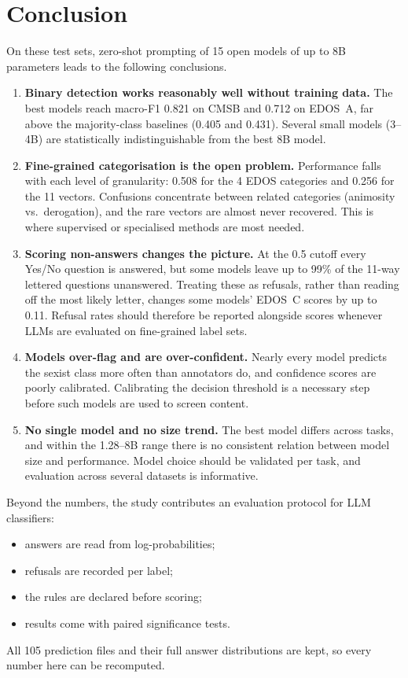 \documentclass[11pt]{article}
\begin{document}
\section{Conclusion}\label{sec:conclusion}
On these test sets, zero-shot prompting of 15 open models of up to 8B parameters leads to the following conclusions.
\begin{enumerate}
  \item \textbf{Binary detection works reasonably well without training data.} The best models reach macro-F1 0.821 on CMSB and 0.712 on EDOS~A, far above the majority-class baselines (0.405 and 0.431). Several small models (3--4B) are statistically indistinguishable from the best 8B model.
  \item \textbf{Fine-grained categorisation is the open problem.} Performance falls with each level of granularity: 0.508 for the 4 EDOS categories and 0.256 for the 11 vectors. Confusions concentrate between related categories (animosity vs.\ derogation), and the rare vectors are almost never recovered. This is where supervised or specialised methods are most needed.
  \item \textbf{Scoring non-answers changes the picture.} At the 0.5 cutoff every Yes/No question is answered, but some models leave up to 99\% of the 11-way lettered questions unanswered. Treating these as refusals, rather than reading off the most likely letter, changes some models' EDOS~C scores by up to 0.11. Refusal rates should therefore be reported alongside scores whenever LLMs are evaluated on fine-grained label sets.
  \item \textbf{Models over-flag and are over-confident.} Nearly every model predicts the sexist class more often than annotators do, and confidence scores are poorly calibrated. Calibrating the decision threshold is a necessary step before such models are used to screen content.
  \item \textbf{No single model and no size trend.} The best model differs across tasks, and within the 1.28--8B range there is no consistent relation between model size and performance. Model choice should be validated per task, and evaluation across several datasets is informative.
\end{enumerate}
Beyond the numbers, the study contributes an evaluation protocol for LLM classifiers:
\begin{itemize}
  \item answers are read from log-probabilities;
  \item refusals are recorded per label;
  \item the rules are declared before scoring;
  \item results come with paired significance tests.
\end{itemize}
All 105 prediction files and their full answer distributions are kept, so every number here can be recomputed.
\end{document}
